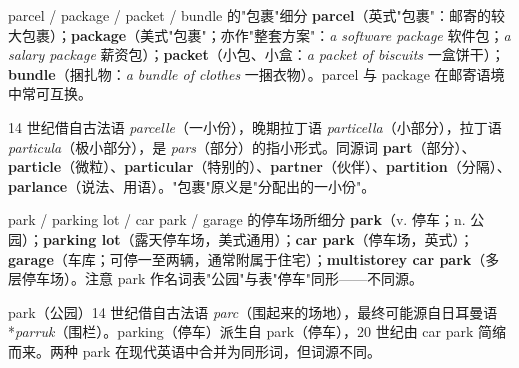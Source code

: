 \documentclass[../main.tex]{subfiles}
\begin{document}


\begin{lex}{parcel / package / packet / bundle 的"包裹"细分}
\textbf{parcel}（英式"包裹"：邮寄的较大包裹）；\textbf{package}（美式"包裹"；亦作"整套方案"：\textit{a software package} 软件包；\textit{a salary package} 薪资包）；\textbf{packet}（小包、小盒：\textit{a packet of biscuits} 一盒饼干）；\textbf{bundle}（捆扎物：\textit{a bundle of clothes} 一捆衣物）。parcel 与 package 在邮寄语境中常可互换。
\end{lex}

\begin{origin}
14 世纪借自古法语 \textit{parcelle}（一小份），晚期拉丁语 \textit{particella}（小部分），拉丁语 \textit{particula}（极小部分），是 \textit{pars}（部分）的指小形式。同源词 \textbf{part}（部分）、\textbf{particle}（微粒）、\textbf{particular}（特别的）、\textbf{partner}（伙伴）、\textbf{partition}（分隔）、\textbf{parlance}（说法、用语）。"包裹"原义是"分配出的一小份"。
\end{origin}




\begin{lex}{park / parking lot / car park / garage 的停车场所细分}
\textbf{park}（v. 停车；n. 公园）；\textbf{parking lot}（露天停车场，美式通用）；\textbf{car park}（停车场，英式）；\textbf{garage}（车库；可停一至两辆，通常附属于住宅）；\textbf{multistorey car park}（多层停车场）。注意 park 作名词表"公园"与表"停车"同形——不同源。
\end{lex}

\begin{origin}
park（公园）14 世纪借自古法语 \textit{parc}（围起来的场地），最终可能源自日耳曼语 *\textit{parruk}（围栏）。parking（停车）派生自 park（停车），20 世纪由 car park 简缩而来。两种 park 在现代英语中合并为同形词，但词源不同。
\end{origin}
\end{document}
